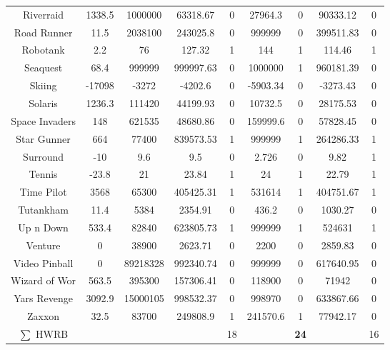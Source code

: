 \begin{table}[!hb]
\begin{center}
\begin{tabular}{c cc cc cc cc}
        Riverraid & 1338.5 & 1000000 & 63318.67 & 0  & 27964.3 & 0 & 90333.12	& 0\\  
        Road Runner & 11.5 & 2038100 & 243025.8 & 0  & 999999 & 0  & 399511.83	& 0\\  
        Robotank & 2.2 & 76 & 127.32 & 1  & 144 & 1  & 114.46	& 1\\  
        Seaquest & 68.4 & 999999 & 999997.63 & 0  & 1000000 & 1 & 960181.39	& 0 \\  
        Skiing & -17098 & -3272 & -4202.6 & 0  & -5903.34 & 0 & -3273.43	& 0 \\  
        Solaris & 1236.3 & 111420 & 44199.93 & 0  & 10732.5 & 0  & 28175.53	& 0\\  
        Space Invaders & 148 & 621535 & 48680.86 & 0  & 159999.6 & 0 & 57828.45	& 0 \\  
        Star Gunner & 664 & 77400 & 839573.53 & 1  & 999999 & 1 & 264286.33	& 1 \\  
        Surround & -10 & 9.6 & 9.5 & 0  & 2.726 & 0  & 9.82	&1\\  
        Tennis & -23.8 & 21 & 23.84 & 1  & 24 & 1  & 22.79	&1\\  
        Time Pilot & 3568 & 65300 & 405425.31 & 1  & 531614 & 1 & 404751.67	& 1 \\  
        Tutankham & 11.4 & 5384 & 2354.91 & 0  & 436.2 & 0  & 1030.27	&0\\  
        Up n Down & 533.4 & 82840 & 623805.73 & 1  & 999999 & 1 & 524631	& 1 \\  
        Venture & 0 & 38900 & 2623.71 & 0  & 2200 & 0  & 2859.83	& 0\\  
        Video Pinball & 0 & 89218328 & 992340.74 & 0  & 999999 & 0 & 617640.95	& 0 \\  
        Wizard of Wor & 563.5 & 395300 & 157306.41 & 0  & 118900 & 0  & 71942	& 0\\  
        Yars Revenge & 3092.9 & 15000105 & 998532.37 & 0  & 998970 & 0 & 633867.66	& 0  \\  
        Zaxxon & 32.5 & 83700 & 249808.9 & 1  & 241570.6 & 1  & 77942.17	&0\\ 
        \midrule
        $\sum$ HWRB & & & & 18 & & \textbf{24}& & 16 \\ 
        \bottomrule
\end{tabular}
\end{center}
\end{table}


\clearpage  




